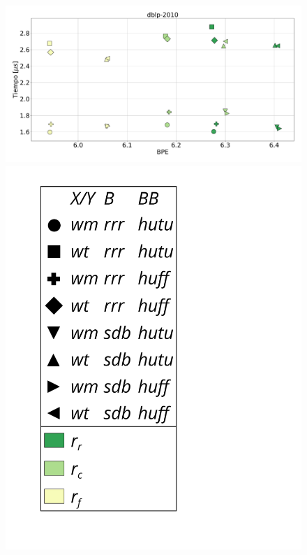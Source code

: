 \begin{figure}
    	\centering
    	\begin{minipage}{1\textwidth}
    			\centering
    			\begin{minipage}{0.8\textwidth}
    				\centering
    				\includegraphics[width=1\linewidth]{img/sdsl/secuencialBig/dblp-2010.pdf}
    			\end{minipage}
    			\begin{minipage}{0.15\textwidth}
    				\centering
    				\includegraphics[scale=.235, clip, trim=70 0 0 0]{img/sdsl/label.pdf}
    			\end{minipage}
    			

\end{minipage}
\end{figure}
